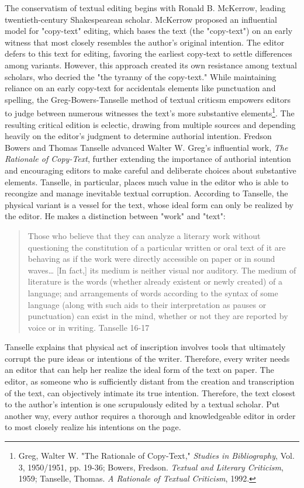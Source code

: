 \documentclass[11pt]{article}
\begin{document}
The conservatism of textual editing begins with Ronald B. McKerrow,
leading twentieth-century Shakespearean scholar. McKerrow proposed an
influential model for "copy-text" editing, which bases the text (the
"copy-text") on an early witness that most closely resembles the
author's original intention. The editor defers to this text for
editing, favoring the earliest copy-text to settle differences among
variants. However, this approach created its own resistance among
textual scholars, who decried the "the tyranny of the copy-text."
While maintaining reliance on an early copy-text for accidentals
elements like punctuation and spelling, the Greg-Bowers-Tanselle
method of textual criticsm empowers editors to judge between numerous
witnesses the text's more substantive elements\footnote{Greg, Walter W. "The Rationale of Copy-Text," \emph{Studies in
Bibliography}, Vol. 3, 1950/1951, pp. 19-36; Bowers, Fredson. \emph{Textual
and Literary Criticism}, 1959; Tanselle, Thomas. \emph{A Rationale of
Textual Criticism}, 1992.}. The resulting
critical edition is eclectic, drawing from multiple sources and
depending heavily on the editor's judgment to determine authorial
intention. Fredson Bowers and Thomas Tanselle advanced Walter
W. Greg's influential work, \emph{The Rationale of Copy-Text}, further
extending the importance of authorial intention and encouraging
editors to make careful and deliberate choices about substantive
elements. Tanselle, in particular, places much value in the editor who
is able to recongize and manage inevitable textual
corruption. According to Tanselle, the physical variant is a vessel
for the text, whose ideal form can only be realized by the editor. He
makes a distinction between "work" and "text":
\begin{quote}
Those who believe that they can analyze a literary work without
questioning the constitution of a particular written or oral text of
it are behaving as if the work were directly accessible on paper or in
sound waves\ldots{} [In fact,] its medium is neither visual nor
auditory. The medium of literature is the words (whether already
existent or newly created) of a language; and arrangements of words
according to the syntax of some language (along with such aids to
their interpretation as pauses or punctuation) can exist in the mind,
whether or not they are reported by voice or in writing. Tanselle
16-17
\end{quote}
Tanselle explains that physical act of inscription involves tools that
ultimately corrupt the pure ideas or intentions of the
writer. Therefore, every writer needs an editor that can help her
realize the ideal form of the text on paper. The editor, as someone
who is sufficiently distant from the creation and transcription of the
text, can objectively intimate its true intention. Therefore, the text
closest to the author’s intention is one scrupulously edited by a
textual scholar. Put another way, every author requires a thorough and
knowledgeable editor in order to most closely realize his intentions
on the page.
\end{document}
